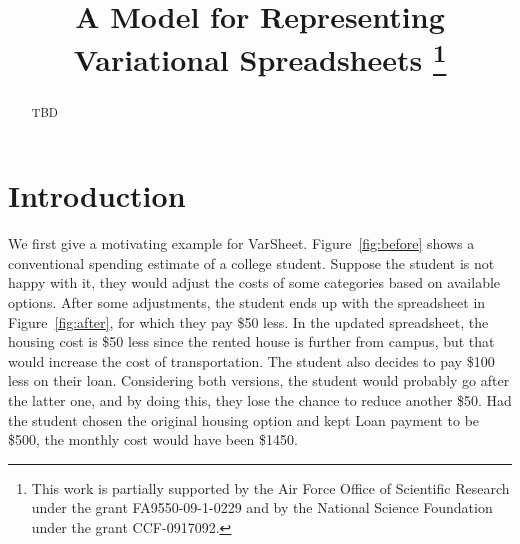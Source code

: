 \documentclass[conference]{IEEEtran}
\date{}
\newlength{\dummylen}
\newcommand{\NOTE}[1]{\setlength{\dummylen}{\fboxrule}\setlength{\fboxrule}{2pt}%
            \vspace{1ex}\noindent\hfill%
            \fbox{\begin{minipage}{.96\columnwidth}#1\end{minipage}}%
            \setlength{\fboxrule}{\dummylen}\hfill{}\vspace{1ex}}
\newcommand{\varsheet}{VarSheet}
\begin{document}
\title{A Model for Representing Variational Spreadsheets
\thanks{This work is partially
supported by the Air Force Office of Scientific
Research under the grant FA9550-09-1-0229 and by the
National Science Foundation under the grant CCF-0917092.
}}

\author{
\and
{}
\and
{}
}

\maketitle

\begin{abstract}
TBD
\end{abstract}

\section{Introduction}
\label{sec:intro}

\NOTE{New motivation needed}

We first give a motivating example for \varsheet. Figure~\ref{fig:before} shows a conventional spending estimate of
a college student. Suppose the student is not happy with it,
they would adjust the costs of some categories based on available options. After some adjustments, the student ends up with the spreadsheet in Figure~\ref{fig:after}, for which they pay \$50 less.
In the updated spreadsheet, the housing cost is \$50 less since the rented house is further from campus, but that would increase
the cost of transportation. The student also decides to pay \$100 less on their loan.
Considering both versions, the student would probably go after the latter one, and by doing this, they lose
the chance to reduce another \$50. Had the student chosen the original housing option and kept Loan payment to be \$500, the monthly
cost would have been \$1450.
\end{document}
